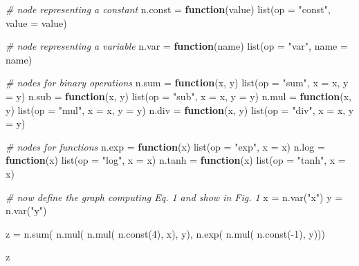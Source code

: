 \documentclass[
  a4paper,
]{article}
\newenvironment{Shaded}{\begin{snugshade}}{\end{snugshade}}
\newcommand{\AttributeTok}[1]{\textcolor[rgb]{0.77,0.63,0.00}{#1}}
\newcommand{\CommentTok}[1]{\textcolor[rgb]{0.56,0.35,0.01}{\textit{#1}}}
\newcommand{\ControlFlowTok}[1]{\textcolor[rgb]{0.13,0.29,0.53}{\textbf{#1}}}
\newcommand{\DecValTok}[1]{\textcolor[rgb]{0.00,0.00,0.81}{#1}}
\newcommand{\FunctionTok}[1]{\textcolor[rgb]{0.00,0.00,0.00}{#1}}
\newcommand{\NormalTok}[1]{#1}
\newcommand{\OtherTok}[1]{\textcolor[rgb]{0.56,0.35,0.01}{#1}}
\newcommand{\SpecialCharTok}[1]{\textcolor[rgb]{0.00,0.00,0.00}{#1}}
\newcommand{\StringTok}[1]{\textcolor[rgb]{0.31,0.60,0.02}{#1}}
\begin{document}
\begin{Shaded}
\begin{Highlighting}[]
\CommentTok{\# node representing a constant}
\NormalTok{n.const }\OtherTok{=} \ControlFlowTok{function}\NormalTok{(value) }\FunctionTok{list}\NormalTok{(}\AttributeTok{op =} \StringTok{"const"}\NormalTok{, }\AttributeTok{value =}\NormalTok{ value)}

\CommentTok{\# node representing a variable}
\NormalTok{n.var }\OtherTok{=} \ControlFlowTok{function}\NormalTok{(name) }\FunctionTok{list}\NormalTok{(}\AttributeTok{op =} \StringTok{"var"}\NormalTok{, }\AttributeTok{name =}\NormalTok{ name)}

\CommentTok{\# nodes for binary operations}
\NormalTok{n.sum }\OtherTok{=} \ControlFlowTok{function}\NormalTok{(x, y) }\FunctionTok{list}\NormalTok{(}\AttributeTok{op =} \StringTok{"sum"}\NormalTok{, }\AttributeTok{x =}\NormalTok{ x, }\AttributeTok{y =}\NormalTok{ y)}
\NormalTok{n.sub }\OtherTok{=} \ControlFlowTok{function}\NormalTok{(x, y) }\FunctionTok{list}\NormalTok{(}\AttributeTok{op =} \StringTok{"sub"}\NormalTok{, }\AttributeTok{x =}\NormalTok{ x, }\AttributeTok{y =}\NormalTok{ y)}
\NormalTok{n.mul }\OtherTok{=} \ControlFlowTok{function}\NormalTok{(x, y) }\FunctionTok{list}\NormalTok{(}\AttributeTok{op =} \StringTok{"mul"}\NormalTok{, }\AttributeTok{x =}\NormalTok{ x, }\AttributeTok{y =}\NormalTok{ y)}
\NormalTok{n.div }\OtherTok{=} \ControlFlowTok{function}\NormalTok{(x, y) }\FunctionTok{list}\NormalTok{(}\AttributeTok{op =} \StringTok{"div"}\NormalTok{, }\AttributeTok{x =}\NormalTok{ x, }\AttributeTok{y =}\NormalTok{ y)}

\CommentTok{\# nodes for functions}
\NormalTok{n.exp }\OtherTok{=} \ControlFlowTok{function}\NormalTok{(x) }\FunctionTok{list}\NormalTok{(}\AttributeTok{op =} \StringTok{"exp"}\NormalTok{, }\AttributeTok{x =}\NormalTok{ x)}
\NormalTok{n.log }\OtherTok{=} \ControlFlowTok{function}\NormalTok{(x) }\FunctionTok{list}\NormalTok{(}\AttributeTok{op =} \StringTok{"log"}\NormalTok{, }\AttributeTok{x =}\NormalTok{ x)}
\NormalTok{n.tanh }\OtherTok{=} \ControlFlowTok{function}\NormalTok{(x) }\FunctionTok{list}\NormalTok{(}\AttributeTok{op =} \StringTok{"tanh"}\NormalTok{, }\AttributeTok{x =}\NormalTok{ x)}

\CommentTok{\# now define the graph computing Eq. 1 and show in Fig. 1}
\NormalTok{x }\OtherTok{=} \FunctionTok{n.var}\NormalTok{(}\StringTok{"x"}\NormalTok{)}
\NormalTok{y }\OtherTok{=} \FunctionTok{n.var}\NormalTok{(}\StringTok{"y"}\NormalTok{)}

\NormalTok{z }\OtherTok{=} \FunctionTok{n.sum}\NormalTok{(}
  \FunctionTok{n.mul}\NormalTok{(}
     \FunctionTok{n.mul}\NormalTok{(}
        \FunctionTok{n.const}\NormalTok{(}\DecValTok{4}\NormalTok{),}
\NormalTok{        x),}
\NormalTok{     y),}
  \FunctionTok{n.exp}\NormalTok{(}
     \FunctionTok{n.mul}\NormalTok{(}
        \FunctionTok{n.const}\NormalTok{(}\SpecialCharTok{{-}}\DecValTok{1}\NormalTok{),}
\NormalTok{        y)))}

\NormalTok{z}
\end{Highlighting}
\end{Shaded}
\end{document}
